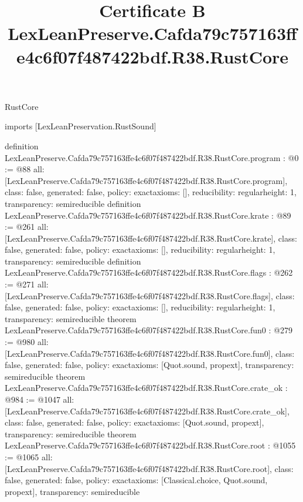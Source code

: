 \begin{lexlean}{RustCore}
\title{Certificate B LexLeanPreserve.Cafda79c757163ffe4c6f07f487422bdf.R38.RustCore}
\begin{coremodule}
imports [LexLeanPreservation.RustSound]

definition LexLeanPreserve.Cafda79c757163ffe4c6f07f487422bdf.R38.RustCore.program : @0 := @88 {
  all: [LexLeanPreserve.Cafda79c757163ffe4c6f07f487422bdf.R38.RustCore.program],
  class: false,
  generated: false,
  policy: exact{axioms: []},
  reducibility: regular{height: 1},
  transparency: semireducible
}
definition LexLeanPreserve.Cafda79c757163ffe4c6f07f487422bdf.R38.RustCore.krate : @89 := @261 {
  all: [LexLeanPreserve.Cafda79c757163ffe4c6f07f487422bdf.R38.RustCore.krate],
  class: false,
  generated: false,
  policy: exact{axioms: []},
  reducibility: regular{height: 1},
  transparency: semireducible
}
definition LexLeanPreserve.Cafda79c757163ffe4c6f07f487422bdf.R38.RustCore.flags : @262 := @271 {
  all: [LexLeanPreserve.Cafda79c757163ffe4c6f07f487422bdf.R38.RustCore.flags],
  class: false,
  generated: false,
  policy: exact{axioms: []},
  reducibility: regular{height: 1},
  transparency: semireducible
}
theorem LexLeanPreserve.Cafda79c757163ffe4c6f07f487422bdf.R38.RustCore.fun0 : @279 := @980 {
  all: [LexLeanPreserve.Cafda79c757163ffe4c6f07f487422bdf.R38.RustCore.fun0],
  class: false,
  generated: false,
  policy: exact{axioms: [Quot.sound, propext]},
  transparency: semireducible
}
theorem LexLeanPreserve.Cafda79c757163ffe4c6f07f487422bdf.R38.RustCore.crate_ok : @984 := @1047 {
  all: [LexLeanPreserve.Cafda79c757163ffe4c6f07f487422bdf.R38.RustCore.crate_ok],
  class: false,
  generated: false,
  policy: exact{axioms: [Quot.sound, propext]},
  transparency: semireducible
}
theorem LexLeanPreserve.Cafda79c757163ffe4c6f07f487422bdf.R38.RustCore.root : @1055 := @1065 {
  all: [LexLeanPreserve.Cafda79c757163ffe4c6f07f487422bdf.R38.RustCore.root],
  class: false,
  generated: false,
  policy: exact{axioms: [Classical.choice, Quot.sound, propext]},
  transparency: semireducible
}


\end{coremodule}
\end{lexlean}
